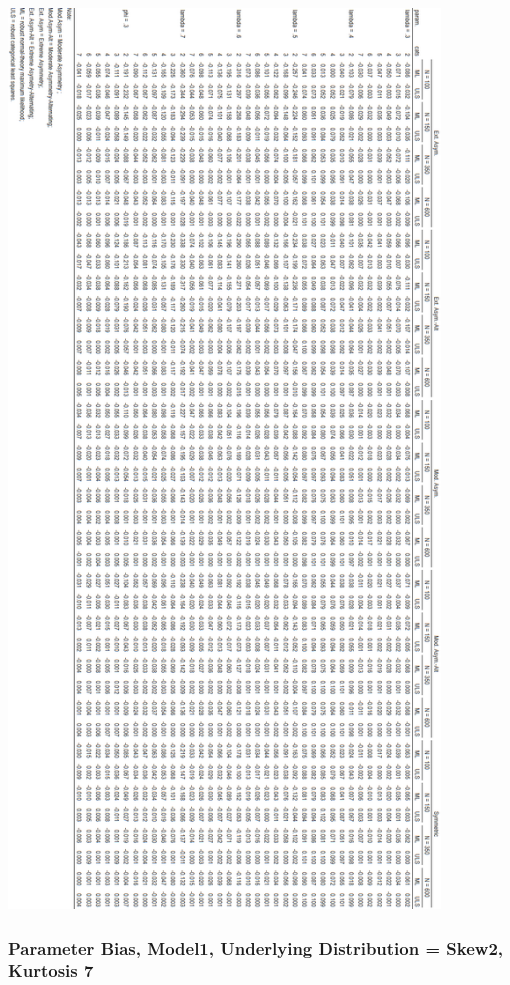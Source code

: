 \documentclass[10,a4paperpaper,]{article}
\begin{document}
\includegraphics[width=325pt]{./figures/tabA6}

\subsubsection{Parameter Bias, Model1, Underlying Distribution = Skew2, Kurtosis 7}
\end{document}
